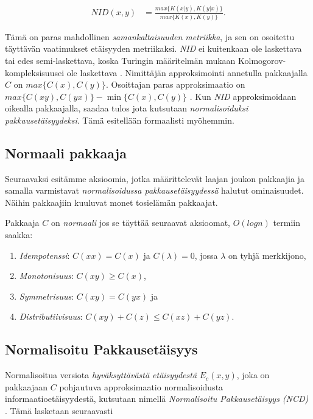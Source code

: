 \documentclass[12pt,finnish,draft]{tktltiki2}
\theoremstyle{definition}
\theoremstyle{remark}
\newcommand{\kolmogorov}{Kolmogorov-kompleksisuus}
\begin{document}
  \begin{align}
    NID(x,y) &= \frac{ max\{K{(x|y)},K{(y|x)}\} }{ max \{K(x),K(y)\}}.
  \end{align}

  Tämä on paras mahdollinen \emph{samankaltaisuuden metriikka}, ja sen on osoitettu \cite{CV05} täyttävän vaatimukset etäisyyden metriikaksi.
  \emph{NID} ei kuitenkaan ole laskettava tai edes semi-laskettava, koska Turingin määritelmän mukaan \kolmogorov ei ole laskettava \cite{CV05}.
  Nimittäjän approksimointi annetulla pakkaajalla $C$ on $max \{C(x),C(y)\}$.
  Osoittajan paras approksimaatio on $max\{C(xy),C(yx)\} - \min\{C(x),C(y)\}$ \cite{CV05}.
  Kun \emph{NID} approksimoidaan oikealla pakkaajalla, saadaa tulos jota kutsutaan \emph{normalisoiduksi pakkausetäisyydeksi}.
  Tämä esitellään formaalisti myöhemmin.

\subsection{Normaali pakkaaja} %
\label{sub:normaali_pakkaaja}

  Seuraavaksi esitämme aksioomia, jotka määrittelevät laajan joukon pakkaajia ja samalla varmistavat \emph{normalisoidussa pakkausetäisyydessä} halutut ominaisuudet.
  Näihin pakkaajiin kuuluvat monet tosielämän pakkaajat.

  Pakkaaja $C$ on \emph{normaali} jos se täyttää seuraavat aksioomat, $O(log n)$ termiin saakka:

  \label{idempotency}
  \begin{enumerate}
    \item \emph{Idempotenssi}: $C(xx) = C(x)$ ja $C(\lambda) = 0$, jossa $\lambda$ on tyhjä merkkijono,
    \item \emph{Monotonisuus}: $C(xy) \geq C(x)$,
    \item \emph{Symmetrisuus}: $C(xy) = C(yx)$ ja
    \item \emph{Distributiivisuus}: $C(xy) + C(z) \leq C(xz) + C(yz)$.
  \end{enumerate}

\subsection{Normalisoitu Pakkausetäisyys} %
\label{sub:normalisoitu_pakkauset_isyys}

  Normalisoitua versiota \emph{hyväksyttävästä etäisyydestä} $E_c(x,y)$, joka on pakkaajaan $C$ pohjautuva approksimaatio normalisoidusta informaatioetäisyydestä, kutsutaan nimellä \emph{Normalisoitu Pakkausetäisyys (NCD)} \cite{CV05}.
  Tämä lasketaan seuraavasti
\end{document}
